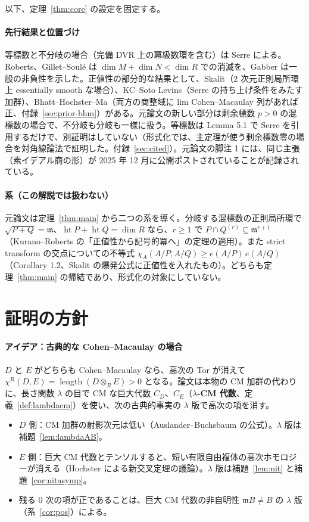 \documentclass[11pt,a4paper]{ltjsarticle}
\numberwithin{equation}{section}
\theoremstyle{plain}
\theoremstyle{definition}
\theoremstyle{definition}
\newcommand{\m}{\mathfrak{m}}
\newcommand{\len}{\operatorname{length}}
\begin{document}
以下、定理~\ref{thm:core} の設定を固定する。

\paragraph{先行結果と位置づけ}
等標数と不分岐の場合（完備 DVR 上の冪級数環を含む）は Serre による。Roberts、Gillet--Soulé は $\dim M+\dim N<\dim R$ での消滅を、Gabber は一般の非負性を示した。正値性の部分的な結果として、Skalit（2 次元正則局所環上 essentially smooth な場合）、KC--Soto Levins（Serre の持ち上げ条件をみたす加群）、Bhatt--Hochster--Ma（両方の商整域に lim Cohen--Macaulay 列があれば正、付録~\ref{sec:prior-bhm}）がある。元論文の新しい部分は剰余標数 $p>0$ の混標数の場合で、不分岐も分岐も一様に扱う。等標数は Lemma 5.1 で Serre を引用するだけで、別証明はしていない（形式化では、主定理が使う剰余標数零の場合を対角線論法で証明した。付録~\ref{sec:cited}）。元論文の脚注 1 には、同じ主張（素イデアル商の形）が 2025 年 12 月に公開ポストされていることが記録されている。

\paragraph{系（この解説では扱わない）}
元論文は定理~\ref{thm:main} から二つの系を導く。分岐する混標数の正則局所環で $\sqrt{P+Q}=\m$、$\operatorname{ht}P+\operatorname{ht}Q=\dim R$ なら、$r\ge1$ で $P\cap Q^{(r)}\subseteq\m^{r+1}$（Kurano--Roberts の「正値性から記号的冪へ」の定理の適用）。また strict transform の交点についての不等式 $\chi_A(A/P,A/Q)\ge e(A/P)\,e(A/Q)$（Corollary 1.2、Skalit の爆発公式に正値性を入れたもの）。どちらも定理~\ref{thm:main} の帰結であり、形式化の対象にしていない。

\section{証明の方針}\label{sec:strategy}

\paragraph{アイデア：古典的な Cohen--Macaulay の場合}
$D$ と $E$ がどちらも Cohen--Macaulay なら、高次の Tor が消えて $\chi^R(D,E) = \len(D\otimes_R E) > 0$ となる。論文は本物の CM 加群の代わりに、長さ関数 $\lambda$ の目で CM な巨大代数 $C_D$、$C_E$（\textbf{$\lambda$-CM 代数}、定義~\ref{def:lambdacm}）を使い、次の古典的事実の $\lambda$ 版で高次の項を消す。
\begin{itemize}
  \item $D$ 側：CM 加群の射影次元は低い（Auslander--Buchsbaum の公式）。$\lambda$ 版は補題~\ref{lem:lambdaAB}。
  \item $E$ 側：巨大 CM 代数とテンソルすると、短い有限自由複体の高次ホモロジーが消える（Hochster による新交叉定理の議論）。$\lambda$ 版は補題~\ref{lem:nit} と補題~\ref{cor:nitasymp}。
  \item 残る $0$ 次の項が正であることは、巨大 CM 代数の非自明性 $\m B\ne B$ の $\lambda$ 版（系~\ref{cor:pos}）による。
\end{itemize}
\end{document}
